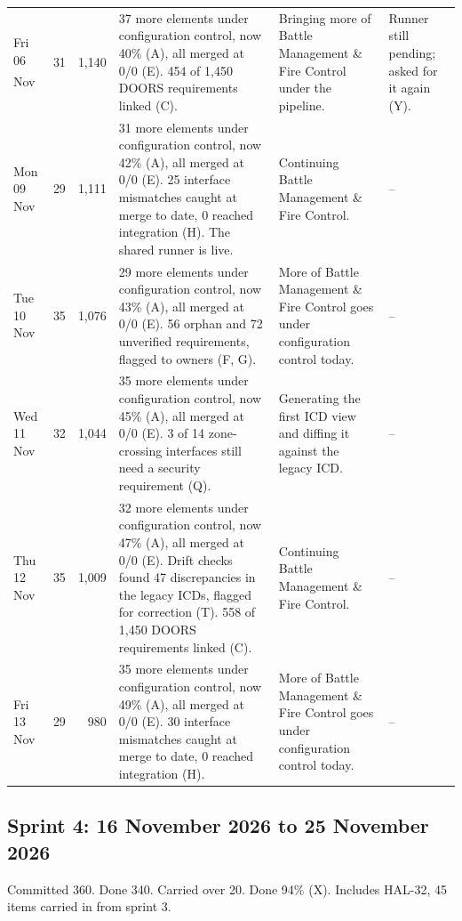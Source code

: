 \documentclass[12pt,letterpaper,oneside]{article}
\newcommand{\blk}{\textsuperscript{\dag}}
\begin{document}
{\begin{longtable}{@{}>{\raggedright}p{} r r >{\raggedright}p{} >{\raggedright}p{} >{\raggedright\arraybackslash}p{}@{}}
Fri 06 Nov\blk & 31 & 1,140 & 37 more elements under configuration control, now 40\% (A), all merged at 0/0 (E). 454 of 1,450 DOORS requirements linked (C). & Bringing more of Battle Management \& Fire Control under the pipeline. & Runner still pending; asked for it again (Y). \\
Mon 09 Nov & 29 & 1,111 & 31 more elements under configuration control, now 42\% (A), all merged at 0/0 (E). 25 interface mismatches caught at merge to date, 0 reached integration (H). The shared runner is live. & Continuing Battle Management \& Fire Control. & -- \\
Tue 10 Nov & 35 & 1,076 & 29 more elements under configuration control, now 43\% (A), all merged at 0/0 (E). 56 orphan and 72 unverified requirements, flagged to owners (F, G). & More of Battle Management \& Fire Control goes under configuration control today. & -- \\
Wed 11 Nov & 32 & 1,044 & 35 more elements under configuration control, now 45\% (A), all merged at 0/0 (E). 3 of 14 zone-crossing interfaces still need a security requirement (Q). & Generating the first ICD view and diffing it against the legacy ICD. & -- \\
Thu 12 Nov & 35 & 1,009 & 32 more elements under configuration control, now 47\% (A), all merged at 0/0 (E). Drift checks found 47 discrepancies in the legacy ICDs, flagged for correction (T). 558 of 1,450 DOORS requirements linked (C). & Continuing Battle Management \& Fire Control. & -- \\
Fri 13 Nov & 29 & 980 & 35 more elements under configuration control, now 49\% (A), all merged at 0/0 (E). 30 interface mismatches caught at merge to date, 0 reached integration (H). & More of Battle Management \& Fire Control goes under configuration control today. & -- \\
\end{longtable}}
\subsection{Sprint 4: 16 November 2026 to 25 November 2026}
Committed 360. Done 340. Carried over 20. Done 94\% (X). Includes HAL-32, 45 items carried in from sprint 3.
\end{document}

